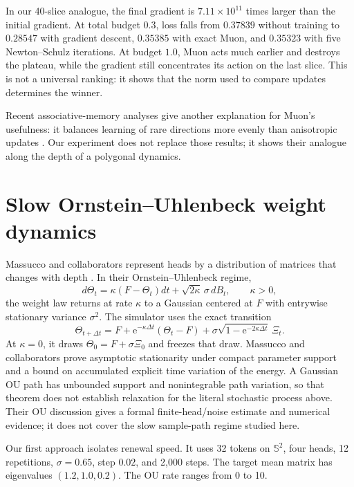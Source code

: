 \documentclass[11pt,a4paper]{article}
\theoremstyle{definition}
\newcommand{\sphere}{\mathbb S}
\newcommand{\e}{\mathrm e}
\begin{document}
In our 40-slice analogue, the final gradient is $7.11\times10^{11}$ times larger than
the initial gradient. At total budget $0.3$, loss falls from $0.37839$ without training
to $0.28547$ with gradient descent, $0.35385$ with exact Muon, and $0.35323$ with five
Newton--Schulz iterations. At budget $1.0$, Muon acts much earlier and destroys the
plateau, while the gradient still concentrates its action on the last slice. This is
not a universal ranking: it shows that the norm used to compare updates determines
the winner.

Recent associative-memory analyses give another explanation for Muon's usefulness: it
balances learning of rare directions more evenly than anisotropic updates
\cite{wang2025muon,kim2026spectral}. Our experiment does not replace those results; it
shows their analogue along the depth of a polygonal dynamics.

\section{Slow Ornstein--Uhlenbeck weight dynamics}
\label{sec:ou}

Massucco and collaborators represent heads by a distribution of matrices that changes
with depth \cite{massucco2026time}. In their Ornstein--Uhlenbeck regime,
\begin{equation}
 d\Theta_t=\kappa(F-\Theta_t)dt+\sqrt{2\kappa}\,\sigma\,dB_t,
 \qquad \kappa>0,\label{eq:ou}
\end{equation}
the weight law returns at rate $\kappa$ to a Gaussian centered at $F$ with entrywise
stationary variance $\sigma^2$.  The simulator uses the exact transition
\[
 \Theta_{t+\Delta t}=F+\e^{-\kappa\Delta t}(\Theta_t-F)
 +\sigma\sqrt{1-\e^{-2\kappa\Delta t}}\,\Xi_t.
\]
At $\kappa=0$, it draws $\Theta_0=F+\sigma\Xi_0$ and freezes that draw.  Massucco and
collaborators prove asymptotic stationarity under compact parameter support and a
bound on accumulated explicit time variation of the energy.  A Gaussian OU path has
unbounded support and nonintegrable path variation, so that theorem does not establish
relaxation for the literal stochastic process above.  Their OU discussion gives a
formal finite-head/noise estimate and numerical evidence; it does not cover the slow
sample-path regime studied here.

Our first approach isolates renewal speed. It uses 32 tokens on $\sphere^2$, four
heads, 12 repetitions, $\sigma=0.65$, step $0.02$, and 2,000 steps. The target mean
matrix has eigenvalues $(1.2,1.0,0.2)$. The OU rate ranges from 0 to 10.
\end{document}
